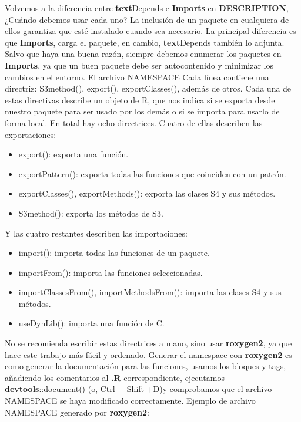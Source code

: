 Volvemos a la diferencia entre \textbf{text}{Depends} e \textbf{Imports} en \textbf{DESCRIPTION}, ¿Cu\'ando debemos
usar cada uno?
La inclusi\'on de un paquete en cualquiera de ellos garantiza que est\'e instalado cuando sea
necesario. La principal diferencia es que \textbf{Imports}, carga el paquete, en cambio, \textbf{text}{Depends}
tambi\'en lo adjunta.
Salvo que haya una buena raz\'on, siempre debemos enumerar los paquetes en \textbf{Imports}, ya
que un buen paquete debe ser autocontenido y minimizar los cambios en el entorno.
El archivo NAMESPACE
Cada l\'inea contiene una directriz: S3method(), export(), exportClasses(), adem\'as de otros.
Cada una de estas directivas describe un objeto de R, que nos indica si se exporta desde
nuestro paquete para ser usado por los dem\'as o si se importa para usarlo de forma local.
En total hay ocho directrices. Cuatro de ellas describen las exportaciones:

\begin{itemize}
    \item export(): exporta una funci\'on.
    \item exportPattern(): exporta todas las funciones que coinciden con un patr\'on.
    \item exportClasses(), exportMethods(): exporta las clases S4 y sus m\'etodos.
    \item S3method(): exporta los m\'etodos de S3.
\end{itemize}

Y las cuatro restantes describen las importaciones:
\begin{itemize}
    \item import(): importa todas las funciones de un paquete.
    \item importFrom(): importa las funciones seleccionadas.
    \item importClassesFrom(), importMethodsFrom(): importa las clases S4 y sus
m\'etodos.
    \item useDynLib(): importa una funci\'on de C.
\end{itemize}

No se recomienda escribir estas directrices a mano, sino usar \textbf{roxygen2}, ya que hace este
trabajo m\'as f\'acil y ordenado.
Generar el namespace con \textbf{roxygen2} es como generar la documentaci\'on para las funciones,
usamos los bloques y tags, a\~nadiendo los comentarios al \textbf{.R} correspondiente, ejecutamos
\textbf{devtools}::document() (o, Ctrl + Shift +D)y comprobamos que el archivo NAMESPACE se
haya modificado correctamente.
Ejemplo de archivo NAMESPACE generado por \textbf{roxygen2}:

